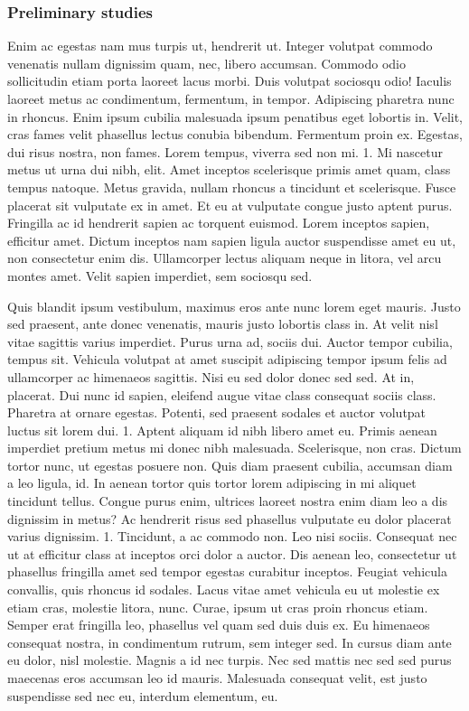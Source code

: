 \documentclass[11pt,]{article}
\begin{document}
\hypertarget{preliminary-studies}{%
\subsubsection{Preliminary studies}\label{preliminary-studies}}

Enim ac egestas nam mus turpis ut, hendrerit ut. Integer volutpat
commodo venenatis nullam dignissim quam, nec, libero accumsan. Commodo
odio sollicitudin etiam porta laoreet lacus morbi. Duis volutpat
sociosqu odio! Iaculis laoreet metus ac condimentum, fermentum, in
tempor. Adipiscing pharetra nunc in rhoncus. Enim ipsum cubilia
malesuada ipsum penatibus eget lobortis in. Velit, cras fames velit
phasellus lectus conubia bibendum. Fermentum proin ex. Egestas, dui
risus nostra, non fames. Lorem tempus, viverra sed non mi. 1. Mi
nascetur metus ut urna dui nibh, elit. Amet inceptos scelerisque primis
amet quam, class tempus natoque. Metus gravida, nullam rhoncus a
tincidunt et scelerisque. Fusce placerat sit vulputate ex in amet. Et eu
at vulputate congue justo aptent purus. Fringilla ac id hendrerit sapien
ac torquent euismod. Lorem inceptos sapien, efficitur amet. Dictum
inceptos nam sapien ligula auctor suspendisse amet eu ut, non
consectetur enim dis. Ullamcorper lectus aliquam neque in litora, vel
arcu montes amet. Velit sapien imperdiet, sem sociosqu sed.

Quis blandit ipsum vestibulum, maximus eros ante nunc lorem eget mauris.
Justo sed praesent, ante donec venenatis, mauris justo lobortis class
in. At velit nisl vitae sagittis varius imperdiet. Purus urna ad, sociis
dui. Auctor tempor cubilia, tempus sit. Vehicula volutpat at amet
suscipit adipiscing tempor ipsum felis ad ullamcorper ac himenaeos
sagittis. Nisi eu sed dolor donec sed sed. At in, placerat. Dui nunc id
sapien, eleifend augue vitae class consequat sociis class. Pharetra at
ornare egestas. Potenti, sed praesent sodales et auctor volutpat luctus
sit lorem dui. 1. Aptent aliquam id nibh libero amet eu. Primis aenean
imperdiet pretium metus mi donec nibh malesuada. Scelerisque, non cras.
Dictum tortor nunc, ut egestas posuere non. Quis diam praesent cubilia,
accumsan diam a leo ligula, id. In aenean tortor quis tortor lorem
adipiscing in mi aliquet tincidunt tellus. Congue purus enim, ultrices
laoreet nostra enim diam leo a dis dignissim in metus? Ac hendrerit
risus sed phasellus vulputate eu dolor placerat varius dignissim. 1.
Tincidunt, a ac commodo non. Leo nisi sociis. Consequat nec ut at
efficitur class at inceptos orci dolor a auctor. Dis aenean leo,
consectetur ut phasellus fringilla amet sed tempor egestas curabitur
inceptos. Feugiat vehicula convallis, quis rhoncus id sodales. Lacus
vitae amet vehicula eu ut molestie ex etiam cras, molestie litora, nunc.
Curae, ipsum ut cras proin rhoncus etiam. Semper erat fringilla leo,
phasellus vel quam sed duis duis ex. Eu himenaeos consequat nostra, in
condimentum rutrum, sem integer sed. In cursus diam ante eu dolor, nisl
molestie. Magnis a id nec turpis. Nec sed mattis nec sed sed purus
maecenas eros accumsan leo id mauris. Malesuada consequat velit, est
justo suspendisse sed nec eu, interdum elementum, eu.
\end{document}
